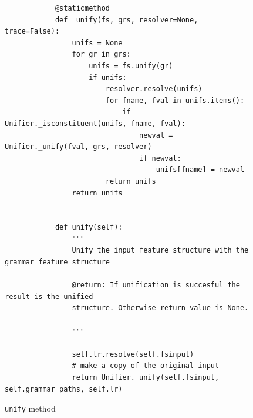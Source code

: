 \documentclass[12pt]{article}
\begin{document}
{\begin{figure}
    {\scriptsize
\begin{verbatim}
            @staticmethod
            def _unify(fs, grs, resolver=None, trace=False):
                unifs = None
                for gr in grs:
                    unifs = fs.unify(gr)
                    if unifs:
                        resolver.resolve(unifs)
                        for fname, fval in unifs.items():
                            if Unifier._isconstituent(unifs, fname, fval):
                                newval = Unifier._unify(fval, grs, resolver)
                                if newval:
                                    unifs[fname] = newval
                        return unifs
                return unifs
            

            def unify(self):
                """
                Unify the input feature structure with the grammar feature structure
                
                @return: If unification is succesful the result is the unified
                structure. Otherwise return value is None.
                
                """
                
                self.lr.resolve(self.fsinput)
                # make a copy of the original input
                return Unifier._unify(self.fsinput, self.grammar_paths, self.lr)
\end{verbatim}
}
\caption{\texttt{unify} method}
\label{fig:unify-method}
\end{figure}
\pagebreak

}
\end{document}
